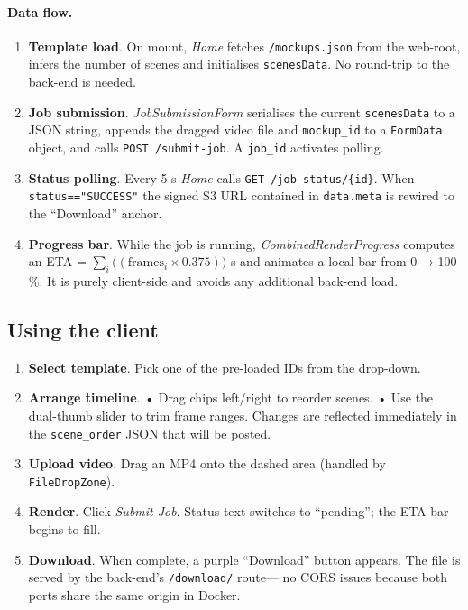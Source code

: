 \paragraph{Data flow.}

\begin{enumerate}
  \item \textbf{Template load}.  
        On mount, \textit{Home} fetches \texttt{/mockups.json} from the
        web-root, infers the number of scenes and initialises
        \texttt{scenesData}.  No round-trip to the back-end is needed.
  \item \textbf{Job submission}.  
        \textit{JobSubmissionForm} serialises the current
        \texttt{scenesData} to a JSON string, appends the dragged video file
        and \texttt{mockup\_id} to a \texttt{FormData} object, and calls
        \texttt{POST /submit-job}.  A \texttt{job\_id} activates polling.
  \item \textbf{Status polling}.  
        Every 5 s \textit{Home} calls \texttt{GET /job-status/\{id\}}.  
        When \texttt{status=="SUCCESS"} the signed S3 URL contained in
        \texttt{data.meta} is rewired to the “Download” anchor.
  \item \textbf{Progress bar}.  
        While the job is running, \textit{CombinedRenderProgress} computes an
        ETA = \(\sum_i\bigl((\text{frames}_i\times0.375)\bigr)\) s and
        animates a local bar from 0 → 100 \%.
        It is purely client-side and avoids any additional back-end load.
\end{enumerate}

\subsection{Using the client}

\begin{enumerate}
  \item \textbf{Select template}.  
        Pick one of the pre-loaded IDs from the drop-down.
  \item \textbf{Arrange timeline}.  
        • Drag chips left/right to reorder scenes.  
        • Use the dual-thumb slider to trim frame ranges.  
        Changes are reflected immediately in the
        \texttt{scene\_order} JSON that will be posted.
  \item \textbf{Upload video}.  
        Drag an MP4 onto the dashed area (handled by
        \texttt{FileDropZone}).
  \item \textbf{Render}.  
        Click \emph{Submit Job}.  
        Status text switches to “pending”; the ETA bar begins to fill.
  \item \textbf{Download}.  
        When complete, a purple “Download” button appears.  
        The file is served by the back-end’s \texttt{/download/} route—
        no CORS issues because both ports share the same origin in Docker.
\end{enumerate}


